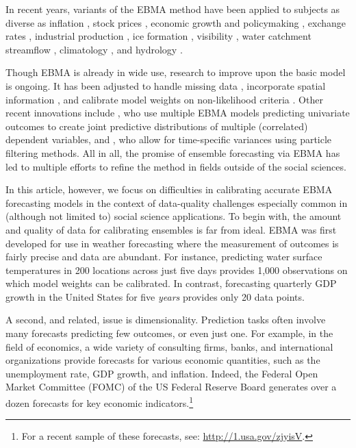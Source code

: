 \documentclass[12pt,fullpage,endnotes]{article}
\begin{document}
In recent years, variants of the EBMA method have been applied to
subjects as diverse as inflation \citep{Wright:2009, Koop:2010,
  Gneiting:2010}, stock prices \citep{Billio:2011}, economic growth
and policymaking \citep{Brock:2007, Billio:2010}, exchange rates
\citep{Wright:2008}, industrial production \citep{Feldkircher:2010},
ice formation \citep{Berrocal:2010}, visibility
\citep{Chmielecki:2010}, water catchment streamflow
\citep{Viney:2009}, climatology \citep{Min:2006, Min:2007,
  Smith:2009}, and hydrology \citep{Zhang:2009}.  

Though EBMA is already in wide use, research to improve upon the basic
model is ongoing. It has been adjusted to handle missing data
\citep{Fraley:2010, Mccandless:2011}, incorporate spatial information
\citep{Feldman:2012}, and calibrate model weights on non-likelihood
criteria \citep[e.g.,][]{Vrugt:2006}.  Other recent innovations
include \citet{MoellerEtAl:2012}, who use multiple EBMA models
predicting univariate outcomes to create joint predictive
distributions of multiple (correlated) dependent variables, and
\citet{RingsEtAl:2012}, who allow for time-specific variances using
particle filtering methods.  All in all, the promise of ensemble
forecasting via EBMA has led to multiple efforts to refine the method
in fields outside of the social sciences.

In this article, however, we focus on difficulties in calibrating
accurate EBMA forecasting models in the context of data-quality
challenges especially common in (although not limited to) social
science applications.  To begin with, the amount and quality of data
for calibrating ensembles is far from ideal. EBMA was first developed
for use in weather forecasting where the measurement of outcomes is
fairly precise and data are abundant. For instance, predicting water
surface temperatures in 200 locations across just five days provides
1,000 observations on which model weights can be calibrated. In
contrast, forecasting quarterly GDP growth in the United States for
five \textit{years} provides only 20 data points.

A second, and related, issue is dimensionality. Prediction tasks often
involve many forecasts predicting few outcomes, or even just one.  For
example, in the field of economics, a wide variety of consulting
firms, banks, and international organizations provide forecasts for
various economic quantities, such as the unemployment rate, GDP growth, and
inflation.  Indeed, the Federal Open Market Committee (FOMC) of the
US Federal Reserve Board generates over a dozen forecasts for
key economic indicators.\footnote{For a recent sample of these
  forecasts, see: \url{http://1.usa.gov/zjyisV}.}
\end{document}
